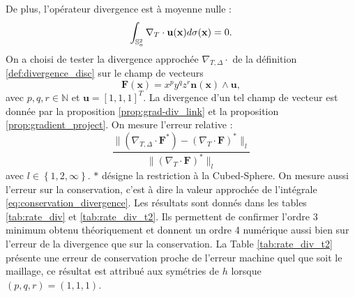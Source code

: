 De plus, l'opérateur divergence est à moyenne nulle :
\begin{equation}
\displaystyle\int_{\mathbb{S}_a^2} \nabla_T \cdot \mathbf{u} ( \mathbf{x} ) d \sigma ( \mathbf{x} ) = 0.
\label{eq:conservation_divergence}
\end{equation}
On a choisi de tester la divergence approchée $\nabla_{T,\Delta} \cdot$ de la définition \ref{def:divergence_disc} sur le champ de vecteurs 
\begin{equation}
\mathbf{F}(\mathbf{x}) = x^p y^q z^r \mathbf{n}(\mathbf{x}) \wedge \mathbf{u},
\label{eq:test_divergence}
\end{equation}
avec $p,q,r \in \mathbb{N}$ et $\mathbf{u} = [1, 1, 1]^T$. La divergence d'un tel champ de vecteur est donnée par la proposition \ref{prop:grad-div_link} et la proposition \ref{prop:gradient_project}. 
On mesure l'erreur relative : 
\begin{equation}
\dfrac{\| \left(\nabla_{T,\Delta} \cdot \mathbf{F}^* \right) - \left( \nabla_{T} \cdot \mathbf{F}\right)^* \|_l}{\| \left( \nabla_{T} \cdot \mathbf{F} \right)^* \|_l}
\end{equation}
avec $l \in \left\lbrace 1, 2, \infty \right\rbrace$. $*$ désigne la restriction à la Cubed-Sphere.
On mesure aussi l'erreur sur la conservation, c'est à dire la valeur approchée de l'intégrale \eqref{eq:conservation_divergence}. Les résultats sont donnés dans les tables \ref{tab:rate_div} et \ref{tab:rate_div_t2}. Ils permettent de confirmer l'ordre 3 minimum obtenu théoriquement et donnent un ordre 4 numérique aussi bien sur l'erreur de la divergence que sur la conservation. La Table \ref{tab:rate_div_t2} présente une erreur de conservation proche de l'erreur machine quel que soit le maillage, ce résultat est attribué aux symétries de $h$ lorsque $(p,q,r)=(1,1,1)$. 
